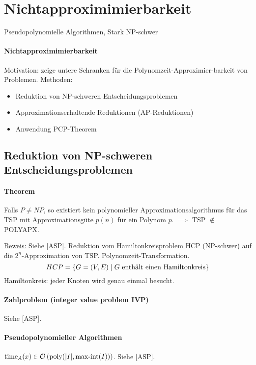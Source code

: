 \section{Nichtapproximimierbarkeit}

\begin{takeaway}
    \item Pseudopolynomielle Algorithmen, Stark NP-schwer
\end{takeaway}

\paragraph{Nichtapproximimierbarkeit}
Motivation: zeige untere Schranken für die Polynomzeit-Approximier-barkeit von Problemen.
Methoden:
\begin{itemize}
    \item Reduktion von NP-schweren Entscheidungsproblemen
    \item Approximationserhaltende Reduktionen (AP-Reduktionen)
    \item Anwendung PCP-Theorem
\end{itemize}


\subsection{Reduktion von NP-schweren Entscheidungsproblemen}

\paragraph{Theorem}
Falls $P \neq NP$, so existiert kein polynomieller Approximationsalgorithmus für das TSP
mit Approximationsgüte $p(n)$ für ein Polynom $p$.
$\implies$ TSP $\notin$ POLYAPX.

\underline{Beweis:}
Siehe [ASP]. Reduktion vom Hamiltonkreisproblem HCP (NP-schwer) auf die $2^n$-Approximation von TSP.
Polynomzeit-Transformation.
$$ HCP = \{ G=(V,E) \; | \; G \text{ enthält einen Hamiltonkreis} \} $$
Hamiltonkreis: jeder Knoten wird genau einmal besucht.

\paragraph{Zahlproblem (integer value problem IVP)}
Siehe [ASP].

\paragraph{Pseudopolynomieller Algorithmen}
$\text{time}_A(x) \in \mathcal{O} \left( \text{poly}( |I|, \text{max-int}(I) ) \right)$.
Siehe [ASP].

